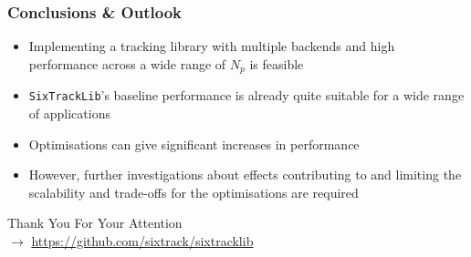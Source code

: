 \documentclass{beamer}
\begin{document}
\begin{frame}
    \frametitle{Conclusions \& Outlook}
    \begin{itemize}
     \item Implementing a tracking library with multiple backends and high performance across a wide range of $N_p$ is feasible
     \item \texttt{SixTrackLib}'s baseline performance is already quite suitable for a wide range of applications
     \item Optimisations can give significant increases in performance
     \item However, further investigations about effects contributing to and limiting the scalability and trade-offs for the optimisations are required
    \end{itemize}
\end{frame}

\begin{frame}
    \begin{center}
    {\HUGE{}Thank You For Your Attention}\\[1em]
    $\longrightarrow$ \url{https://github.com/sixtrack/sixtracklib}
    \end{center}
\end{frame}
\end{document}
